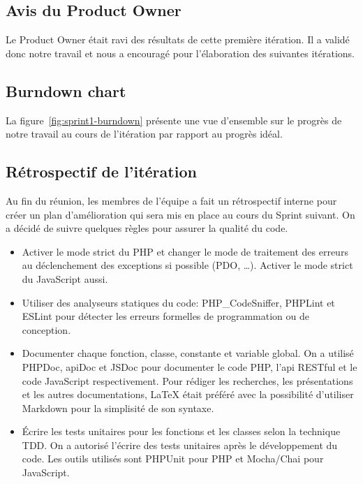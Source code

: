 \subsection{Avis du Product Owner}

Le Product Owner était ravi des résultats de cette première itération. Il a
validé donc notre travail et nous a encouragé pour l'élaboration des suivantes
itérations.

\subsection{Burndown chart}

La figure~\ref{fig:sprint1-burndown} présente une vue d'ensemble sur le progrès
de notre travail au cours de l'itération par rapport au progrès idéal.



\subsection{Rétrospectif de l'itération}

Au fin du réunion, les membres de l'équipe a fait un rétrospectif interne pour
créer un plan d'amélioration qui sera mis en place au cours du Sprint suivant.
On a décidé de suivre quelques règles pour assurer la qualité du code.

\begin{itemize}
    \item Activer le mode strict du PHP et changer le mode de traitement des
        erreurs au déclenchement des exceptions si possible (PDO, \ldots).
        Activer le mode strict du JavaScript aussi.
    \item Utiliser des analyseurs statiques du code: PHP\_CodeSniffer, PHPLint
        et ESLint pour détecter les erreurs formelles de programmation ou de
        conception.
    \item Documenter chaque fonction, classe, constante et variable global. On
        a utilisé PHPDoc, apiDoc et JSDoc pour documenter le code PHP, l'api
        RESTful et le code JavaScript respectivement. Pour rédiger les
        recherches, les présentations et les autres documentations, \LaTeX{}
        était préféré avec la possibilité d'utiliser Markdown pour la
        simplisité de son syntaxe.
    \item Écrire les tests unitaires pour les fonctions et les classes selon la
        technique \acrshort{TDD}. On a autorisé l'écrire des tests unitaires
        après le développement du code. Les outils utilisés sont PHPUnit pour
        PHP et Mocha/Chai pour JavaScript.
\end{itemize}

